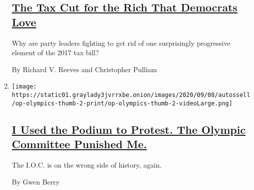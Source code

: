 \begin{enumerate}
  \hypertarget{the-tax-cut-for-the-rich-that-democrats-love}{%
  \subsection{\texorpdfstring{\href{/2020/09/07/opinion/salt-tax-deduction-cut.html}{The
  Tax Cut for the Rich That Democrats
  Love}}{The Tax Cut for the Rich That Democrats Love}}\label{the-tax-cut-for-the-rich-that-democrats-love}}

  Why are party leaders fighting to get rid of one surprisingly
  progressive element of the 2017 tax bill?

  By Richard V. Reeves and Christopher Pulliam
\item
  \texttt{[image: https://static01.graylady3jvrrxbe.onion/images/2020/09/08/autossell/op-olympics-thumb-2-print/op-olympics-thumb-2-videoLarge.png]}

  \hypertarget{i-used-the-podium-to-protest-the-olympic-committee-punished-me}{%
  \subsection{\texorpdfstring{\href{/2020/09/07/opinion/gwen-berry-olympics-protest.html}{I
  Used the Podium to Protest. The Olympic Committee Punished
  Me.}}{I Used the Podium to Protest. The Olympic Committee Punished Me.}}\label{i-used-the-podium-to-protest-the-olympic-committee-punished-me}}

  The I.O.C. is on the wrong side of history, again.

  By Gwen Berry
\end{enumerate}

